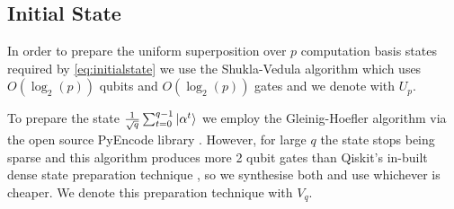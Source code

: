 \subsection{Initial State}
In order to prepare the uniform superposition over $p$ computation basis states required by \eqref{eq:initialstate} we use the Shukla-Vedula algorithm \cite{shukla2024efficient} which uses $O(\log_2(p))$ qubits and $O(\log_2 (p))$ gates and we denote with $U_p$.

To prepare the state  $\frac{1}{\sqrt{q}}\sum_{t=0}^{q-1}\ket{\alpha^t}$ we employ the Gleinig-Hoefler algorithm \cite{10.1109/DAC18074.2021.9586240} via the open source PyEncode library \cite{suresh2026pyencode}. However, for large $q$ the state stops being sparse and this algorithm produces more 2 qubit gates than Qiskit's in-built dense state preparation technique \cite{iten2016quantum}, so we synthesise both and use whichever is cheaper. We denote this preparation technique with $V_q$.

